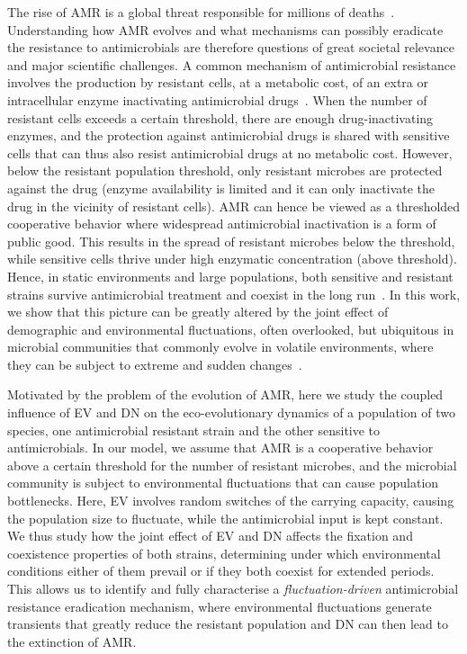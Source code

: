 \documentclass{article}
\begin{document}
The rise of AMR is a global threat  responsible for millions of deaths~\cite{oneill2016tackling}. Understanding how AMR evolves and what mechanisms can possibly eradicate the resistance to antimicrobials are therefore questions of great societal relevance and major scientific challenges. A common mechanism of antimicrobial resistance involves the production by resistant cells, at a metabolic cost, of an extra or intracellular enzyme inactivating antimicrobial drugs~\cite{davies1994inactivation,Wright05,Yurtsev13}. When the number of resistant cells exceeds a certain threshold, there are enough drug-inactivating enzymes, and the protection against antimicrobial drugs is shared with sensitive cells that can thus also resist antimicrobial drugs at no metabolic cost. However, below the resistant population threshold, only resistant microbes are protected against the drug (enzyme availability is limited and it can only inactivate the drug in the vicinity of resistant cells). AMR can hence be viewed as a thresholded cooperative behavior where widespread antimicrobial inactivation is a form of public good. This results in the spread of resistant microbes below the threshold, while sensitive cells thrive under high enzymatic concentration (above threshold). Hence, in static environments and large populations, both sensitive and resistant strains survive antimicrobial treatment and coexist in the long run~\cite{Yurtsev13, vega2014collective, meredith2015collective, bottery2016selective}. In this work, we show that this picture can be greatly altered by the joint effect of demographic and environmental fluctuations, often overlooked, but ubiquitous in microbial communities that commonly evolve in volatile environments, where they can be subject to extreme and sudden changes~\cite{Wahl02,Brockhurst07,Brockhurst07b,Patwas09,shade2012,stegen2012,Coates18}.
 
Motivated by the problem of the evolution of AMR, here we study the coupled influence of EV and DN on the eco-evolutionary dynamics of a population of two species, one antimicrobial resistant strain and the other sensitive to antimicrobials. In our model, we assume that AMR is a cooperative behavior above a certain threshold for the number of resistant microbes, and the microbial community is subject to environmental fluctuations that can cause population bottlenecks. Here, EV involves random switches of the carrying capacity, causing the population size to fluctuate, while the antimicrobial input is kept constant. We thus study how the joint effect of EV and DN affects the fixation and coexistence properties of both strains, determining under which environmental conditions either of them prevail or if they both coexist for extended periods. This allows us to identify and fully characterise a \emph{fluctuation-driven} antimicrobial resistance eradication mechanism, where environmental fluctuations generate transients that greatly reduce the resistant population and DN can then lead to the extinction of AMR. %
\end{document}
